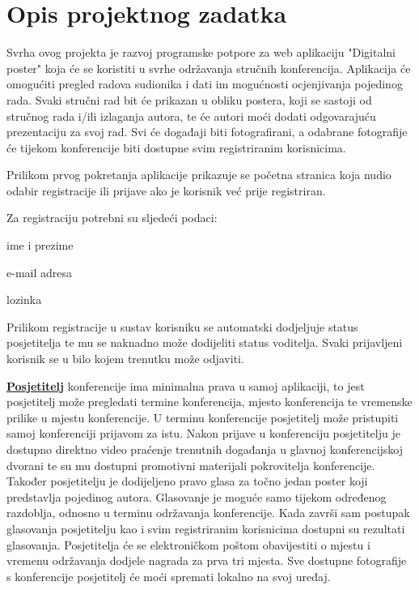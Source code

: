 \chapter{Opis projektnog zadatka}
		
		Svrha ovog projekta je razvoj programske potpore za web aplikaciju "Digitalni poster" koja će se koristiti u svrhe održavanja stručnih konferencija. Aplikacija će omogućiti pregled radova sudionika i dati im mogućnosti ocjenjivanja pojedinog rada. Svaki stručni rad bit će prikazan u obliku postera, koji se sastoji od stručnog rada i/ili izlaganja autora, te će autori moći dodati odgovarajuću prezentaciju za svoj rad. Svi će događaji biti fotografirani, a odabrane fotografije će tijekom konferencije biti dostupne svim registriranim korisnicima.

		Prilikom prvog pokretanja aplikacije prikazuje se početna stranica koja nudio odabir registracije ili prijave ako je korisnik već prije registriran.

		Za registraciju potrebni su sljedeći podaci:

		\begin{packed_item}
			\item {ime i prezime}
			\item {e-mail adresa}
			\item {lozinka}
		\end{packed_item}
		Prilikom registracije u sustav korisniku se automatski dodjeljuje status posjetitelja te mu se naknadno može dodijeliti status voditelja. Svaki prijavljeni korisnik se u bilo kojem trenutku može odjaviti.
		
		\textbf{\underline{Posjetitelj}} konferencije ima minimalna prava u samoj aplikaciji, to jest posjetitelj može pregledati termine konferencija, mjesto konferencija te vremenske prilike u mjestu konferencije. U terminu konferencije posjetitelj može pristupiti samoj konferenciji prijavom za istu. Nakon prijave u konferenciju posjetitelju je dostupno direktno video praćenje trenutnih događanja u glavnoj konferencijskoj dvorani te su mu dostupni promotivni materijali pokrovitelja konferencije. Također posjetitelju je dodijeljeno pravo glasa za točno jedan poster koji predstavlja pojedinog autora. Glasovanje je moguće samo tijekom određenog razdoblja, odnosno u terminu održavanja konferencije. Kada završi sam postupak glasovanja posjetitelju kao i svim registriranim korisnicima dostupni su rezultati glasovanja. Posjetitelja će se elektroničkom poštom obavijestiti o mjestu i vremenu održavanja dodjele nagrada za prva tri mjesta. Sve dostupne fotografije s konferencije posjetitelj će moći spremati lokalno na svoj uređaj.
		
